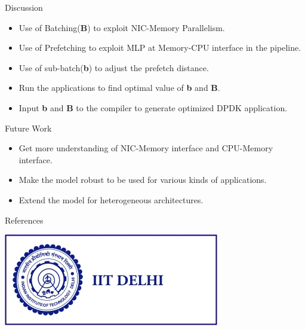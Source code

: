 \documentclass[final]{beamer}
\newlength{\onecolwid}
\begin{document}
\begin{frame}
\begin{columns}[t]
\begin{column}{\onecolwid}

\begin{exampleblock}{Discussion}
\begin{itemize}
 \item Use of Batching({\bf B}) to exploit NIC-Memory Parallelism.
 \item Use of Prefetching to exploit MLP at Memory-CPU interface in the pipeline.
 \item Use of sub-batch({\bf b}) to adjust the prefetch distance.
 \item Run the applications to find optimal value of {\bf b} and {\bf B}.
 \item Input {\bf b} and {\bf B} to the compiler to generate optimized DPDK application.
\end{itemize}
\end{exampleblock}


\begin{exampleblock}{Future Work}
\begin{itemize}
\item Get more understanding of NIC-Memory interface and CPU-Memory interface. 
\item Make the model robust to be used for various kinds of applications.
\item Extend the model for heterogeneous architectures.
\end{itemize}
\end{exampleblock}


\begin{exampleblock}{References}

\nocite{*} %
\small{
\vspace{1cm}}
\end{exampleblock}


\begin{center}
\includegraphics[width=0.6\linewidth]{img/iitd_logo.jpg}
\end{center}


\end{column}
\end{columns}
\end{frame}
\end{document}
